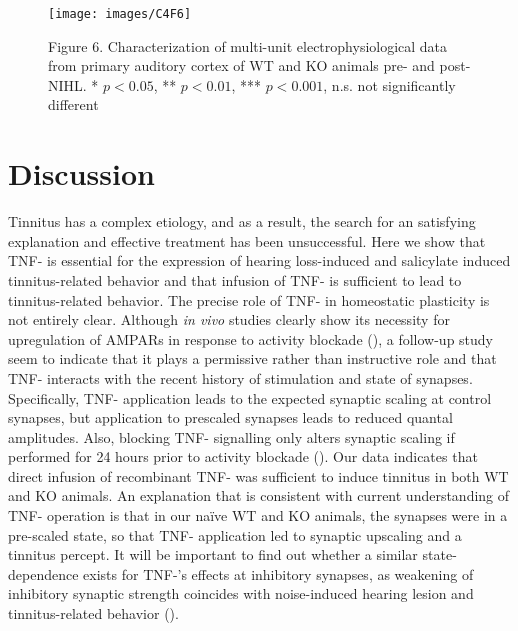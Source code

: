 \begin{figure}
	\centering
		\texttt{[image: images/C4F6]}
	\begin{changemargin}{1in}{1in}
	\footnotesize{Figure 6. Characterization of multi-unit electrophysiological data from primary auditory cortex of WT and KO animals pre- and post-NIHL. * $p<0.05$, ** $p<0.01$, *** $p<0.001$, n.s. not significantly different}
	\end{changemargin}
\end{figure}

\section{Discussion}

Tinnitus has a complex etiology, and as a result, the search for an satisfying explanation and effective treatment has been unsuccessful. Here we show that TNF-\textalpha{} is essential for the expression of hearing loss-induced and salicylate induced tinnitus-related behavior and that infusion of TNF-\textalpha{} is sufficient to lead to tinnitus-related behavior. The precise role of TNF-\textalpha{} in homeostatic plasticity is not entirely clear. Although \textit{in vivo} studies clearly show its necessity for upregulation of AMPARs in response to activity blockade (\cite{Stellwagen2006}), a follow-up study seem to indicate that it plays a permissive rather than instructive role and that TNF-\textalpha{} interacts with the recent history of stimulation and state of synapses. Specifically, TNF-\textalpha{} application leads to the expected synaptic scaling at control synapses, but application to prescaled synapses leads to reduced quantal amplitudes. Also, blocking TNF-\textalpha{} signalling only alters synaptic scaling if performed for 24 hours prior to activity blockade (\cite{Steinmetz2010}). Our data indicates that direct infusion of recombinant TNF-\textalpha{} was sufficient to induce tinnitus in both WT and KO animals. An explanation that is consistent with current understanding of TNF-\textalpha{} operation is that in our na\"ive WT and KO animals, the synapses were in a pre-scaled state, so that TNF-\textalpha{} application led to synaptic upscaling and a tinnitus percept. It will be important to find out whether a similar state-dependence exists for TNF-\textalpha{}'s effects at inhibitory synapses, as weakening of inhibitory synaptic strength coincides with noise-induced hearing lesion and tinnitus-related behavior (\cite{Yang2013}).

